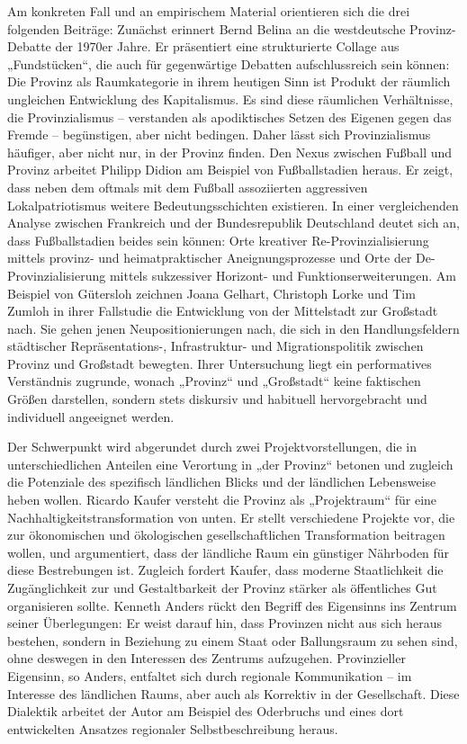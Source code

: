 \begin{multicols*}{2}
Am konkreten Fall und an empirischem Material orientieren sich die drei folgenden Beiträge: Zunächst erinnert Bernd Belina an die westdeutsche Provinz-Debatte der 1970er Jahre. Er präsentiert eine strukturierte Collage aus „Fundstücken“, die auch für gegenwärtige Debatten aufschlussreich sein können: Die Provinz als Raumkategorie in ihrem heutigen Sinn ist Produkt der räumlich ungleichen Entwicklung des Kapitalismus. Es sind diese räumlichen Verhältnisse, die Provinzialismus – verstanden als apodiktisches Setzen des Eigenen gegen das Fremde – begünstigen, aber nicht bedingen. Daher lässt sich Provinzialismus häufiger, aber nicht nur, in der Provinz finden. Den Nexus zwischen Fußball und Provinz arbeitet Philipp Didion am Beispiel von Fußballstadien heraus. Er zeigt, dass neben dem oftmals mit dem Fußball assoziierten aggressiven Lokalpatriotismus weitere Bedeutungsschichten existieren. In einer vergleichenden Analyse zwischen Frankreich und der Bundesrepublik Deutschland deutet sich an, dass Fußballstadien beides sein können: Orte kreativer Re-Provinzialisierung mittels provinz- und heimatpraktischer Aneignungsprozesse und Orte der De-Provinzialisierung mittels sukzessiver Horizont- und Funktionserweiterungen. Am Beispiel von Gütersloh zeichnen Joana Gelhart, Christoph Lorke und Tim Zumloh in ihrer Fallstudie die Entwicklung von der Mittelstadt zur Großstadt nach. Sie gehen jenen Neupositionierungen nach, die sich in den Handlungsfeldern städtischer Repräsentations-, Infrastruktur- und Migrationspolitik zwischen Provinz und Großstadt bewegten. Ihrer Untersuchung liegt ein performatives Verständnis zugrunde, wonach „Provinz“ und „Großstadt“ keine faktischen Größen darstellen, sondern stets diskursiv und habituell hervorgebracht und individuell angeeignet werden.

Der Schwerpunkt wird abgerundet durch zwei Projektvorstellungen, die in unterschiedlichen Anteilen eine Verortung in „der Provinz“ betonen und zugleich die Potenziale des spezifisch ländlichen Blicks und der ländlichen Lebensweise heben wollen. Ricardo Kaufer versteht die Provinz als „Projektraum“ für eine Nachhaltigkeitstransformation von unten. Er stellt verschiedene Projekte vor, die zur ökonomischen und ökologischen gesellschaftlichen Transformation beitragen wollen, und argumentiert, dass der ländliche Raum ein günstiger Nährboden für diese Bestrebungen ist. Zugleich fordert Kaufer, dass moderne Staatlichkeit die Zugänglichkeit zur und Gestaltbarkeit der Provinz stärker als öffentliches Gut organisieren sollte. Kenneth Anders rückt den Begriff des Eigensinns ins Zentrum seiner Überlegungen: Er weist darauf hin, dass Provinzen nicht aus sich heraus bestehen, sondern in Beziehung zu einem Staat oder Ballungsraum zu sehen sind, ohne deswegen in den Interessen des Zentrums aufzugehen. Provinzieller Eigensinn, so Anders, entfaltet sich durch regionale Kommunikation – im Interesse des ländlichen Raums, aber auch als Korrektiv in der Gesellschaft. Diese Dialektik arbeitet der Autor am Beispiel des Oderbruchs und eines dort entwickelten Ansatzes regionaler Selbstbeschreibung heraus.


\end{multicols*}
